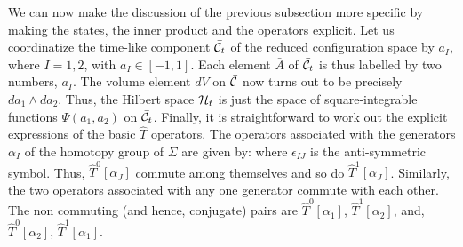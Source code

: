 We can now make the discussion of the previous subsection more specific by
making the states, the inner product and the operators explicit. Let us
coordinatize the time-like component $\bar{\cal C}_t$ of the reduced
configuration space by $a_I$, where $I=1,2$, with $a_I\in [-1,1]$. Each
element $\bar A$ of $\bar{\cal C}_t$ is thus labelled by two numbers, $a_I$.
The volume element
$d\bar V$ on $\bar{\cal C}$ now turns out to be precisely $da_1\wedge da_2$.
Thus, the Hilbert space ${\cal H}_t$ is just the space of square-integrable
functions $\Psi(a_1,a_2)$ on $\bar{\cal C}_t$. Finally, it is straightforward
to work out the explicit expressions of the basic ${\hat T}$ operators. The
operators associated with the generators $\alpha_I$ of the homotopy group of
$\Sigma$ are given by:
where $\epsilon_{IJ}$ is the anti-symmetric symbol. Thus, ${\hat
T}^0[\alpha_J]$
commute among themselves and so do ${\hat T}^1 [\alpha_J]$. Similarly, the two
operators associated with any one generator commute with each other. The non
commuting (and hence, conjugate) pairs are ${\hat T}^0[\alpha_1]$,
${\hat T}^1[\alpha_2]$, and, ${\hat T}^0[\alpha_2]$, ${\hat T}^1[\alpha_1]$.

